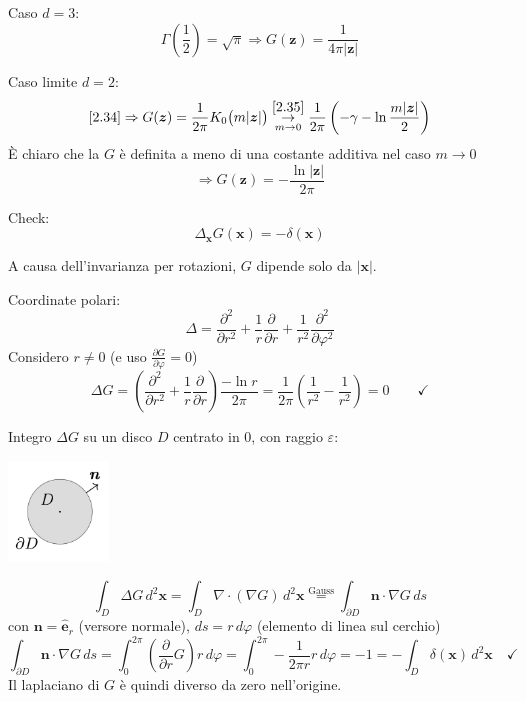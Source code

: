 \documentclass[a4paper,11pt]{report}
\newcommand{\vect}[1]{\boldsymbol{#1}}
\newcommand{\x}{\boldsymbol{x}}
\newcommand{\z}{\boldsymbol{z}}
\begin{document}
Caso $d=3$:
\begin{equation}
\Gamma\left(\frac{1}{2}\right)=\sqrt{\pi} \Rightarrow G(\z)=\frac{1}{4\pi|\z|}
\tag{$\theequation^\prime$}
\label{2.38'}
\end{equation}

Caso limite $d=2$:
\begin{equation}
\eqref{2.34}\Rightarrow G(\z)=\frac{1}{2\pi}K_0\big(m|\z|\big)\underset{m\to 0}{\overset{\eqref{2.35}}{\rightarrow}} \frac{1}{2\pi}\left(-\gamma -\ln \frac{m|\z|}{2}\right)
\end{equation}
\`E chiaro che la $G$ \`e definita a meno di una costante additiva nel caso $m\to 0$
\begin{equation}
\Rightarrow G(\z)=-\frac{\ln |\z|}{2\pi}
\end{equation}

\medskip

Check:
\[
\Delta_{\x}G(\x)=-\delta(\x)
\]

A causa dell'invarianza per rotazioni, $G$ dipende solo da $|\x|$.

Coordinate polari:
\[
\Delta =\frac{\partial^2}{\partial r^2}+\frac{1}{r}\frac{\partial}{\partial r}+\frac{1}{r^2}\frac{\partial ^2}{\partial \varphi^2}
\]
Considero $r\neq 0$ (e uso $\frac{\partial G}{\partial \varphi}=0$)
\[
\Delta G = \left(\frac{\partial^2}{\partial r^2}+\frac{1}{r}\frac{\partial}{\partial r}\right)\frac{-\ln r}{2\pi}=\frac{1}{2\pi}\left(\frac{1}{r^2} - \frac{1}{r^2}\right)=0\qquad \checkmark
\]

Integro $\Delta G$ su un disco $D$ centrato in 0, con raggio $\varepsilon$:
\begin{center}
\includegraphics[width=0.2\textwidth]{immagini/disco}
\end{center}
\[
\int_D \Delta G \, d^2\x=\int_D \nabla\cdot(\nabla G) \, d^2\x \overset{\text{Gauss}}{=}\int_{\partial D} \vect{n} \cdot \nabla G \, ds
\]
con $\vect{n}=\hat{\vect{e}}_r$ (versore normale), $ds=r\,d\varphi$ (elemento di linea sul cerchio)
\[
\int_{\partial D}\vect{n}\cdot \nabla G \, ds=\int_{0}^{2\pi}\left(\frac{\partial}{\partial r}G\right)r \, d\varphi=\int_0^{2\pi}-\frac{1}{2\pi r}r \, d\varphi =-1 =-\int_D \delta(\x)\, d^2\x \quad \checkmark
\]
Il laplaciano di $G$ \`e quindi diverso da zero nell'origine.
\end{document}
